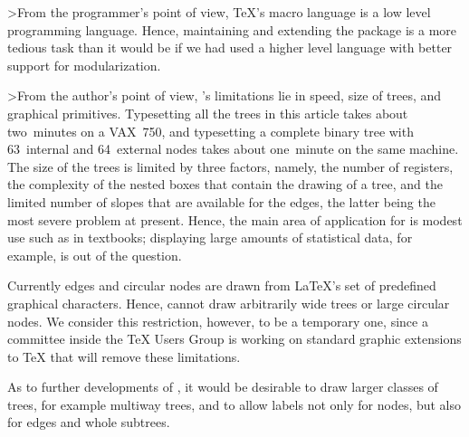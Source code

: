 >From the programmer's point of view, \TeX{}'s macro language is
a low level programming language. Hence, maintaining and extending
the package is a more tedious task than it would be if we had used
a higher level language with better support for modularization.

>From the author's point of view, \TreeTeX{}'s limitations lie in
speed, size of trees, and graphical primitives.
Typesetting all the trees in this article takes about two~minutes on
a VAX~750, and typesetting a complete binary tree with 63~internal
and 64~external nodes takes about one~minute on the same machine.
The size of the trees is limited by three factors, namely,
the number of registers, the complexity of the nested boxes that
contain the drawing of a tree, and the limited number of slopes
that are available for the edges, the latter being the most severe 
problem at present. Hence, the main area of application for
\TreeTeX{} is modest use such as in textbooks; displaying
large amounts of statistical data, for example, is out of the question.

Currently edges and circular nodes are drawn from \LaTeX{}'s set of 
predefined graphical characters. Hence, \TreeTeX{} cannot draw
arbitrarily wide trees or large circular nodes. We consider
this restriction, however, to be a temporary one, since a committee inside
the \TeX{} Users Group is  working on standard graphic 
extensions to \TeX{} that will remove these limitations.

As to further developments of \TreeTeX{}, it would be desirable to
draw larger classes of trees, for example multiway trees, and to allow
labels not only for nodes, but also for edges and whole subtrees.


\Treestyle{\vdist{60pt}}
\dummyhalfcenterdim@n=10pt

